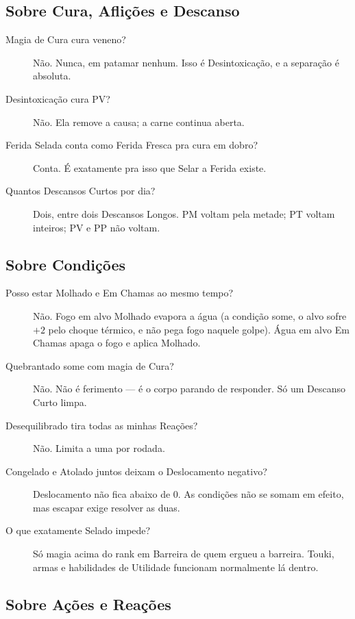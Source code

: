 \subsection{Sobre Cura, Aflições e Descanso}

\begin{description}
    \item[Magia de Cura cura veneno?] Não. Nunca, em patamar nenhum. Isso é Desintoxicação, e
          a separação é absoluta.
    \item[Desintoxicação cura PV?] Não. Ela remove a causa; a carne continua aberta.
    \item[Ferida Selada conta como Ferida Fresca pra cura em dobro?] Conta. É exatamente pra
          isso que Selar a Ferida existe.
    \item[Quantos Descansos Curtos por dia?] Dois, entre dois Descansos Longos. PM voltam pela
          metade; PT voltam inteiros; PV e PP não voltam.
\end{description}

\subsection{Sobre Condições}

\begin{description}
    \item[Posso estar Molhado e Em Chamas ao mesmo tempo?] Não. Fogo em alvo Molhado evapora a
          água (a condição some, o alvo sofre $+2$ pelo choque térmico, e não pega fogo naquele
          golpe). Água em alvo Em Chamas apaga o fogo e aplica Molhado.
    \item[Quebrantado some com magia de Cura?] Não. Não é ferimento --- é o corpo parando de
          responder. Só um Descanso Curto limpa.
    \item[Desequilibrado tira todas as minhas Reações?] Não. Limita a uma por rodada.
    \item[Congelado e Atolado juntos deixam o Deslocamento negativo?] Deslocamento não fica
          abaixo de 0. As condições não se somam em efeito, mas escapar exige resolver as duas.
    \item[O que exatamente Selado impede?] Só magia acima do rank em Barreira de quem ergueu a
          barreira. Touki, armas e habilidades de Utilidade funcionam normalmente lá dentro.
\end{description}

\subsection{Sobre Ações e Reações}

